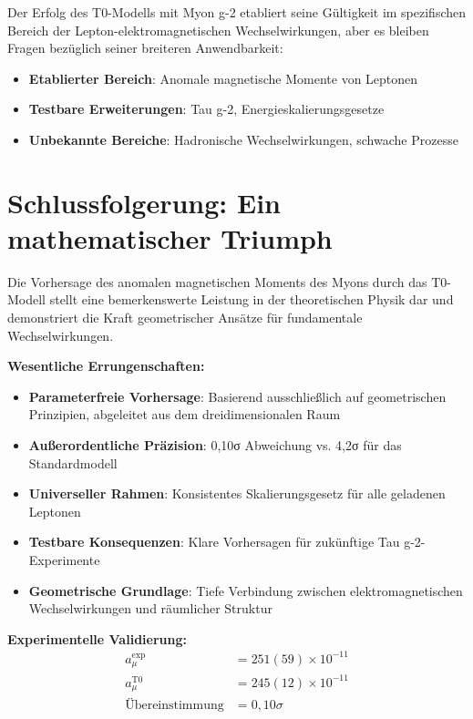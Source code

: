 \documentclass[12pt,a4paper]{report}
\begin{document}
	Der Erfolg des T0-Modells mit Myon g-2 etabliert seine Gültigkeit im spezifischen Bereich der Lepton-elektromagnetischen Wechselwirkungen, aber es bleiben Fragen bezüglich seiner breiteren Anwendbarkeit:
	\begin{itemize}
		\item \textbf{Etablierter Bereich}: Anomale magnetische Momente von Leptonen
		\item \textbf{Testbare Erweiterungen}: Tau g-2, Energieskalierungsgesetze
		\item \textbf{Unbekannte Bereiche}: Hadronische Wechselwirkungen, schwache Prozesse
	\end{itemize}
	
	\section{Schlussfolgerung: Ein mathematischer Triumph}
	\label{sec:conclusion}
	
	Die Vorhersage des anomalen magnetischen Moments des Myons durch das T0-Modell stellt eine bemerkenswerte Leistung in der theoretischen Physik dar und demonstriert die Kraft geometrischer Ansätze für fundamentale Wechselwirkungen.
	
	\textbf{Wesentliche Errungenschaften:}
	\begin{itemize}
		\item \textbf{Parameterfreie Vorhersage}: Basierend ausschließlich auf geometrischen Prinzipien, abgeleitet aus dem dreidimensionalen Raum
		\item \textbf{Außerordentliche Präzision}: 0,10σ Abweichung vs. 4,2σ für das Standardmodell
		\item \textbf{Universeller Rahmen}: Konsistentes Skalierungsgesetz für alle geladenen Leptonen
		\item \textbf{Testbare Konsequenzen}: Klare Vorhersagen für zukünftige Tau g-2-Experimente
		\item \textbf{Geometrische Grundlage}: Tiefe Verbindung zwischen elektromagnetischen Wechselwirkungen und räumlicher Struktur
	\end{itemize}
	
	\textbf{Experimentelle Validierung:}
	\begin{align}
		a_\mu^{\text{exp}} &= 251(59) \times 10^{-11} \\
		a_\mu^{\text{T0}} &= 245(12) \times 10^{-11} \\
		\text{Übereinstimmung} &= 0,10\sigma
	\end{align}
	
\end{document}
